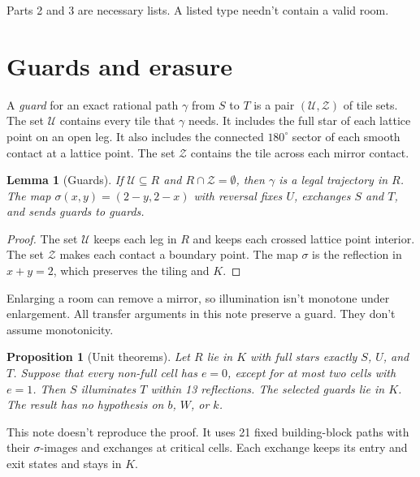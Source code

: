\documentclass[11pt]{article}
\newtheorem{lemma}{Lemma}
\newtheorem{proposition}{Proposition}
\theoremstyle{remark}
\begin{document}
Parts 2 and 3 are necessary lists. A listed type needn't contain a valid room.

\section{Guards and erasure}\label{sec:guards}
A \emph{guard} for an exact rational path $\gamma$ from $S$ to $T$ is a pair $(\mathcal U,\mathcal Z)$ of tile sets. The set $\mathcal U$ contains every tile that $\gamma$ needs. It includes the full star of each lattice point on an open leg. It also includes the connected $180^\circ$ sector of each smooth contact at a lattice point. The set $\mathcal Z$ contains the tile across each mirror contact.

\begin{lemma}[Guards]\label{lem:guard}
If $\mathcal U\subseteq R$ and $R\cap\mathcal Z=\emptyset$, then $\gamma$ is a legal trajectory in $R$. The map $\sigma(x,y)=(2-y,2-x)$ with reversal fixes $U$, exchanges $S$ and $T$, and sends guards to guards.
\end{lemma}
\begin{proof}
The set $\mathcal U$ keeps each leg in $R$ and keeps each crossed lattice point interior. The set $\mathcal Z$ makes each contact a boundary point. The map $\sigma$ is the reflection in $x+y=2$, which preserves the tiling and $K$.
\end{proof}

Enlarging a room can remove a mirror, so illumination isn't monotone under enlargement. All transfer arguments in this note preserve a guard. They don't assume monotonicity.

\begin{proposition}[Unit theorems]\label{prop:unit}
Let $R$ lie in $K$ with full stars exactly $S$, $U$, and $T$. Suppose that every non-full cell has $e=0$, except for at most two cells with $e=1$. Then $S$ illuminates $T$ within 13 reflections. The selected guards lie in $K$. The result has no hypothesis on $b$, $W$, or $k$.
\end{proposition}

This note doesn't reproduce the proof. It uses 21 fixed building-block paths with their $\sigma$-images and exchanges at critical cells. Each exchange keeps its entry and exit states and stays in $K$.
\end{document}
